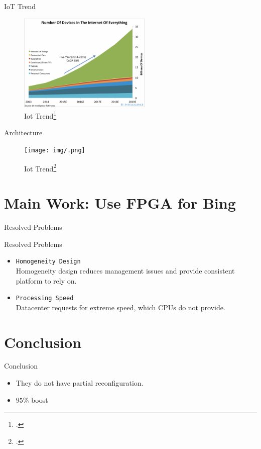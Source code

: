 \documentclass[t]{beamer}
\begin{document}
\begin{frame}{IoT Trend}
	\begin{figure}
        \includegraphics[width=2.5in]{img/iot_trend.png}
		\caption{Iot Trend\footcite{http://www.ironpaper.com/webintel/articles/internet-things-market-statistics-2015}}
		\label{fig:Iot_trend}
	\end{figure}
\end{frame}

\begin{frame}{Architecture}
	\begin{figure}
        \texttt{[image: img/.png]}
		\caption{Iot Trend\footcite{http://www.ironpaper.com/webintel/articles/internet-things-market-statistics-2015}}
		\label{fig:Iot_trend}
	\end{figure}
\end{frame}


\section{Main Work: Use FPGA for Bing}
\begin{frame}{Resolved Problems}
    \begin{block}{Resolved Problems}
        \begin{itemize}
            \item {\tt{Homogeneity Design}} \\
            Homogeneity design reduces management issues and provide consistent platform to
            rely on.
            \item {\tt{Processing Speed}} \\
            Datacenter requests for extreme speed, which CPUs do not provide. 
        \end{itemize}
    \end{block}
\end{frame}


\section{Conclusion}
\begin{frame}{Conclusion}
    \begin{itemize}
        \item They do not have partial reconfiguration.
        \item $95\%$ boost
    \end{itemize}
\end{frame}
\end{document}
